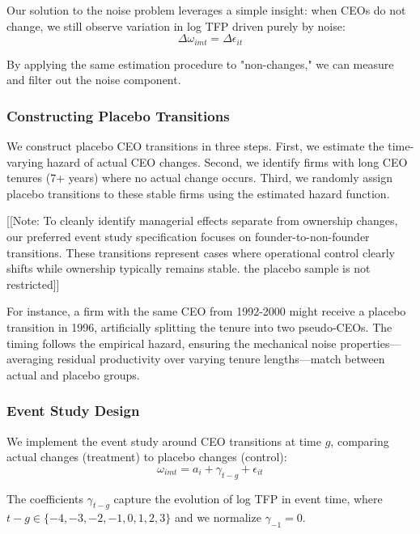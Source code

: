 \documentclass[11pt,a4paper]{article}
\begin{document}
Our solution to the noise problem leverages a simple insight: when CEOs do not change, we still observe variation in log TFP driven purely by noise:
\begin{equation}
\Delta\omega_{imt} = \Delta\epsilon_{it}
\end{equation}

By applying the same estimation procedure to "non-changes," we can measure and filter out the noise component.

\subsubsection{Constructing Placebo Transitions}

We construct placebo CEO transitions in three steps. First, we estimate the time-varying hazard of actual CEO changes. Second, we identify firms with long CEO tenures (7+ years) where no actual change occurs. Third, we randomly assign placebo transitions to these stable firms using the estimated hazard function.

[[Note: To cleanly identify managerial effects separate from ownership changes, our preferred event study specification focuses on founder-to-non-founder transitions. These transitions represent cases where operational control clearly shifts while ownership typically remains stable. the placebo sample is not restricted]]

For instance, a firm with the same CEO from 1992-2000 might receive a placebo transition in 1996, artificially splitting the tenure into two pseudo-CEOs. The timing follows the empirical hazard, ensuring the mechanical noise properties—averaging residual productivity over varying tenure lengths—match between actual and placebo groups.

\subsubsection{Event Study Design}

We implement the event study around CEO transitions at time $g$, comparing actual changes (treatment) to placebo changes (control):
\begin{equation}
\omega_{imt} = a_i + \gamma_{t-g} + \epsilon_{it}
\end{equation}

The coefficients $\gamma_{t-g}$ capture the evolution of log TFP in event time, where $t-g \in \{-4, -3, -2, -1, 0, 1, 2, 3\}$ and we normalize $\gamma_{-1} = 0$.
\end{document}
